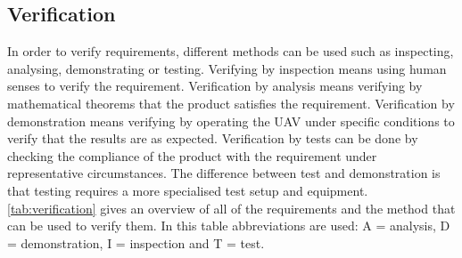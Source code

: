 \subsection{Verification}%
\label{sec:verification}

In order to verify requirements, different methods can be used such as inspecting, analysing, demonstrating or testing. Verifying by inspection means using human senses to verify the requirement. Verification by analysis means verifying by mathematical theorems that the product satisfies the requirement. Verification by demonstration means verifying by operating the UAV under specific conditions to verify that the results are as expected. Verification by tests can be done by checking the compliance of the product with the requirement under representative circumstances. The difference between test and demonstration is that testing requires a more specialised test setup and equipment. \autoref{tab:verification} gives an overview of all of the requirements and the method that can be used to verify them. In this table abbreviations are used: A = analysis, D = demonstration, I = inspection and T = test. 

